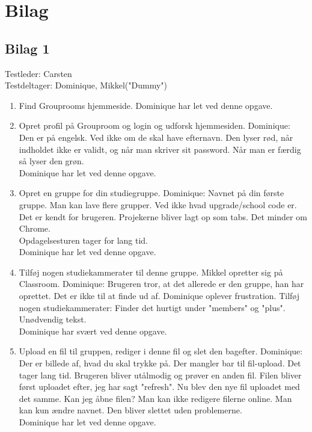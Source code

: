 \documentclass[12pt]{article}
\begin{document}
\section{Bilag}
\subsection*{Bilag 1}

Testleder: Carsten\\
Testdeltager: Dominique, Mikkel("Dummy")\\
\begin{enumerate}
  \item Find Grouprooms hjemmeside.
  Dominique har let ved denne opgave.

\item Opret profil på Grouproom og login og udforsk hjemmesiden.
Dominique: Den er på engelsk. Ved ikke om de skal have efternavn. Den lyser rød, når indholdet ikke er validt, og når man skriver sit password. Når man er færdig så lyser den grøn. \\
Dominique har let ved denne opgave.

\item Opret en gruppe for din studiegruppe.
Dominique: Navnet på din første gruppe. Man kan lave flere grupper. Ved ikke hvad upgrade/school code er.
Det er kendt for brugeren. Projekerne bliver lagt op som tabs. Det minder om Chrome. \\
Opdagelsesturen tager for lang tid.\\
Dominique har let ved denne opgave.

\item Tilføj nogen studiekammerater til denne gruppe.
Mikkel opretter sig på Classroom.
Dominique: Brugeren tror, at det allerede er den gruppe, han har oprettet.
Det er ikke til at finde ud af. Dominique oplever frustration.
Tilføj nogen studiekammerater: Finder det hurtigt under "members" og "plus". Unødvendig tekst.\\
Dominique har svært ved denne opgave. 

\item Upload en fil til gruppen, rediger i denne fil og slet den bagefter.
Dominique: Der er billede af, hvad du skal trykke på. Der mangler bar til fil-upload. Det tager lang tid. Brugeren bliver utålmodig og prøver en anden fil.
Filen bliver først uploadet efter, jeg har sagt "refresh".
Nu blev den nye fil uploadet med det samme.
Kan jeg åbne filen? Man kan ikke redigere filerne online. Man kan kun ændre navnet.
Den bliver slettet uden problemerne.\\
Dominique har let ved denne opgave.


\end{enumerate}
\end{document}

